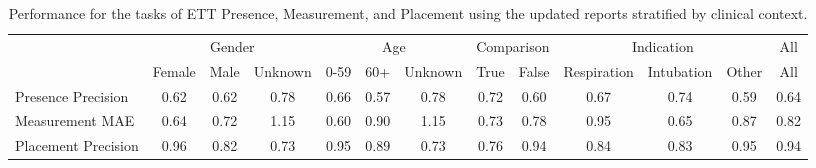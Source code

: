 
    \begin{table}[htbp]
    \centering
    \small
    \caption{Performance for the tasks of ETT Presence, Measurement, and Placement using the updated reports stratified by clinical context.}
    \setlength{\tabcolsep}{2pt}  %
    \begin{tabular}{lcccccccccccc}
    \toprule
    & \multicolumn{3}{c}{Gender} & \multicolumn{3}{c}{Age} & \multicolumn{2}{c}{Comparison} & \multicolumn{3}{c}{Indication} & All \\
    & Female & Male & Unknown & 0-59 & 60+ & Unknown & True & False & Respiration & Intubation & Other & All \\
    \midrule
    Presence Precision & 0.62 & 0.62 & 0.78 & 0.66 & 0.57 & 0.78 & 0.72 & 0.60 & 0.67 & 0.74 & 0.59 & 0.64 \\
Measurement MAE & 0.64 & 0.72 & 1.15 & 0.60 & 0.90 & 1.15 & 0.73 & 0.78 & 0.95 & 0.65 & 0.87 & 0.82 \\
Placement Precision & 0.96 & 0.82 & 0.73 & 0.95 & 0.89 & 0.73 & 0.76 & 0.94 & 0.84 & 0.83 & 0.95 & 0.94 \\

    \bottomrule
    \end{tabular}
    \label{tab:ett_metrics_stratified}
    \end{table}
    